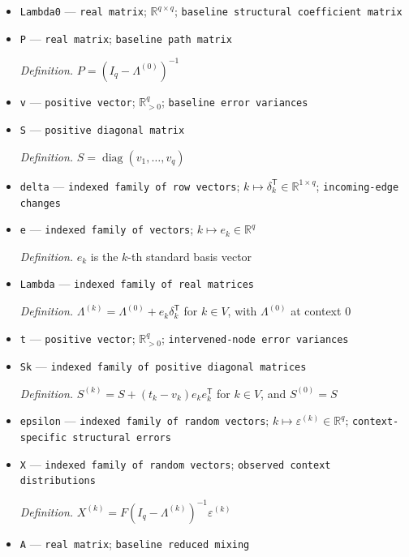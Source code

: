 \documentclass{article}
\begin{document}
\begin{itemize}
  \item \texttt{Lambda0} --- \texttt{real matrix}; \(\mathbb{R}^{q\times q}\); \texttt{baseline structural coefficient matrix}
  \item \texttt{P} --- \texttt{real matrix}; \texttt{baseline path matrix}
  \par\smallskip\noindent\emph{Definition.} \(P=(I_q-\Lambda^{(0)})^{-1}\)
  \item \texttt{v} --- \texttt{positive vector}; \(\mathbb{R}_{>0}^{q}\); \texttt{baseline error variances}
  \item \texttt{S} --- \texttt{positive diagonal matrix}
  \par\smallskip\noindent\emph{Definition.} \(S=\operatorname{diag}(v_1,\ldots,v_q)\)
  \item \texttt{delta} --- \texttt{indexed family of row vectors}; \(k\mapsto\delta_k^{\mathsf T}\in\mathbb{R}^{1\times q}\); \texttt{incoming-\allowbreak{}edge changes}
  \item \texttt{e} --- \texttt{indexed family of vectors}; \(k\mapsto e_k\in\mathbb R^q\)
  \par\smallskip\noindent\emph{Definition.} \(e_k\) is the \(k\)-th standard basis vector
  \item \texttt{Lambda} --- \texttt{indexed family of real matrices}
  \par\smallskip\noindent\emph{Definition.} \(\Lambda^{(k)}=\Lambda^{(0)}+e_k\delta_k^{\mathsf T}\) for \(k\in V\), with \(\Lambda^{(0)}\) at context \(0\)
  \item \texttt{t} --- \texttt{positive vector}; \(\mathbb{R}_{>0}^{q}\); \texttt{intervened-\allowbreak{}node error variances}
  \item \texttt{Sk} --- \texttt{indexed family of positive diagonal matrices}
  \par\smallskip\noindent\emph{Definition.} \(S^{(k)}=S+(t_k-v_k)e_ke_k^{\mathsf T}\) for \(k\in V\), and \(S^{(0)}=S\)
  \item \texttt{epsilon} --- \texttt{indexed family of random vectors}; \(k\mapsto\varepsilon^{(k)}\in\mathbb{R}^{q}\); \texttt{context-\allowbreak{}specific structural errors}
  \item \texttt{X} --- \texttt{indexed family of random vectors}; \texttt{observed context distributions}
  \par\smallskip\noindent\emph{Definition.} \(X^{(k)}=F(I_q-\Lambda^{(k)})^{-1}\varepsilon^{(k)}\)
  \item \texttt{A} --- \texttt{real matrix}; \texttt{baseline reduced mixing}

\end{itemize}
\end{document}
